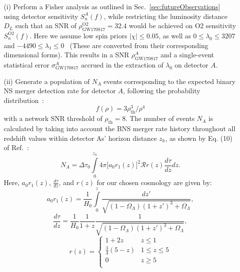 \documentclass[prd,twocolumn,nofootinbib,superscriptaddress,amsmath,amssymb]{revtex4-1}
\begin{document}
\begin{enumerate}
\item[(i)] Perform a Fisher analysis as outlined in Sec.~\ref{sec:futureObservations} using detector sensitivity $S_n^A(f)$, while restricting the luminosity distance $D_L$ such that an SNR of $\rho^{\text{O2}}_{\text{GW170817}}=32.4$ would be achieved on O2 sensitivity $S_n^{\text{O2}}(f)$.
Here we assume low spin priors $|\chi| \leq 0.05$, as well as $0 \leq \lambda_0 \leq 3207$ and $-4490 \leq \lambda_1 \leq 0$~\cite{delPozzo:TaylorTidal} (These are converted from their corresponding dimensional forms).
This results in a SNR $\rho^A_{\text{GW170817}}$ and a single-event statistical error $\sigma_\text{GW170817}^A$ accrued in the extraction of $\lambda_0$ on detector $A$.

\item[(ii)] Generate a population of $N_A$ events corresponding to the expected binary NS merger detection rate for detector $A$, following the probability distribution~\cite{Shutz:SNR,Chen:SNR}:
\begin{equation}\label{eq:population}
f(\rho)=3 \rho_{\text{th}}^3/\rho^4
\end{equation}
with a network SNR threshold of $\rho_{\text{th}}=8$.
The number of events $N_A$ is calculated by taking into account the BNS merger rate history throughout all redshift values within detector As' horizon distance $z_h$, as shown by Eq. (10) of Ref.~\cite{Cutler:BNSmerger}:
\begin{equation}
N_A=\Delta \tau_0 \int\limits^{z_{h}}_0 4 \pi \lbrack  a_0r_1(z)\rbrack^2 \mathcal{R} r(z) \frac{d \tau}{dz} dz.
\end{equation}
Here, $a_0r_1(z)$, $\frac{d\tau}{dz}$, and $r(z)$ for our chosen cosmology are given by:
\begin{equation}
a_0r_1(z) = \frac{1}{H_0}\int\limits^z_0 \frac{dz'}{\sqrt{(1-\Omega_{\Lambda})(1+z')^3+\Omega_{\Lambda}}},
\end{equation}
\begin{equation}
\frac{d\tau}{dz} = \frac{1}{H_0} \frac{1}{1+z}\frac{1}{\sqrt{(1-\Omega_{\Lambda})(1+z')^3+\Omega_{\Lambda}}},
\end{equation}
\begin{equation}
r(z) = \left\{
\begin{array}{ll}
      1+2z & z \leq 1 \\
      \frac{3}{4}(5-z) & 1\leq z\leq 5 \\
      0 & z\geq 5\\ 
\end{array} 
\right.
\end{equation}


\end{enumerate}
\end{document}
